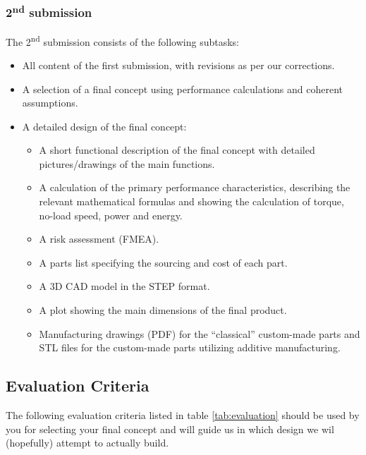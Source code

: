 \documentclass[headinclude=true]{scrartcl}
\begin{document}
\subsubsection{2\textsuperscript{nd} submission}
The 2\textsuperscript{nd} submission consists of the following subtasks:
\begin{itemize}
 \item All content of the first submission, with revisions as per our corrections.
 \item A selection of a final concept using performance calculations and coherent assumptions.
 \item A detailed design of the final concept:
 \begin{itemize}
  \item A short functional description of the final concept with detailed pictures/drawings of the main functions.
  \item A calculation of the primary performance characteristics, describing the relevant mathematical formulas and showing the calculation of torque, no-load speed, power and energy.
  \item A risk assessment (FMEA).
  \item A parts list specifying the sourcing and cost of each part.
  \item A 3D CAD model in the STEP format.
  \item A plot showing the main dimensions of the final product.
  \item Manufacturing drawings (PDF) for the ``classical'' custom-made parts and STL files for the custom-made parts utilizing additive manufacturing.
 \end{itemize}

\end{itemize}

\subsection{Evaluation Criteria}
\label{sec:evaluation}

The following evaluation criteria listed in table \ref{tab:evaluation} should be used by you for selecting your final concept and will guide us in which design we wil (hopefully) attempt to actually build.
\end{document}
